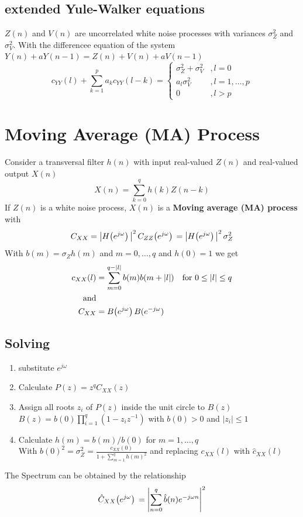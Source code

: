 \documentclass[accentcolor=tud4c,9.5pt,nochapname,bigchapter,paper=a5report]{tudreport}
\begin{document}
\subsection{extended Yule-Walker equations}
$Z(n)$ and $V(n)$ are uncorrelated white noise processes with variances $\sigma^2_Z$ and $\sigma_V^2$. With the
differencee equation of the system $Y(n)+aY(n-1)=Z(n)+V(n)+aV(n-1)$
\begin{equation}
c_{YY}(l)+\sum\limits_{k=1}^p a_kc_{YY}(l-k) =\begin{cases}
\sigma_Z^2+\sigma_V^2 &,l=0 \\
a_l\sigma_V^2 &,l=1,\ldots,p\\
0 &,l>p 
\end{cases}
\end{equation}

\section{Moving Average (MA) Process}
Consider a transversal filter $h(n)$ with input real-valued $Z(n)$ and real-valued output $X(n)$
\begin{equation}
X(n)=\sum\limits_{k=0}^q h(k)Z(n-k)
\end{equation} 
If $Z(n)$ is a white noise process, $X(n)$ is a {\bf Moving average (MA) process} with
\begin{equation}
C_{XX}=\left|H{\left(e^{j\omega}\right)}\,\right|^2C_{ZZ}{\left(e^{j\omega}\right)}\, =\left|H{\left(e^{j\omega}\right)}\,\right|^2\sigma_Z^2 
\end{equation}
With $b(m)=\sigma_Z h(m)$ and $m=0,\ldots,q$ and $h(0)=1$ we get
\begin{align}
c_{XX}(l)&=\sum\limits_{m=0}^{q-|l|} b(m)b(m+|l|) \quad \text{for } 0\leq |l| \leq q\\
\text{and}\\
C_{XX} &= B{\left(e^{j\omega}\right)}\, B(e^{-j\omega})
\end{align}
\subsection{Solving} \label{solv}
\begin{enumerate}
  \item substitute $e^{j\omega}$
  \item Calculate $P(z)=z^qC_{XX}(z)$
  \item Assign all roots $z_i$ of $P(z)$ inside the unit circle to $B(z)$ \\
  		$B(z)=b(0)\prod_{i=1}^q(1-z_iz^{-1})$ with $b(0)>0$ and $|z_i|\leq 1$
  \item Calculate $h(m)=b(m)/b(0)$ for $m=1,\ldots,q$\\ 
		With $b(0)^2=\sigma_Z^2=\frac{c_{XX}(0)}{1+\sum_{m=1}^q h(m)^2}$ and replacing $c_{XX}(l)$ with $\hat{c}_{XX}(l)$ 
\end{enumerate}
The Spectrum can be obtained by the relationship
\begin{equation}
\hat{C}_{XX}{\left(e^{j\omega}\right)}\, = \left|\sum\limits_{n=0}^q \hat{b}(n)e^{-j\omega n} \right|^2
\end{equation}
\end{document}
